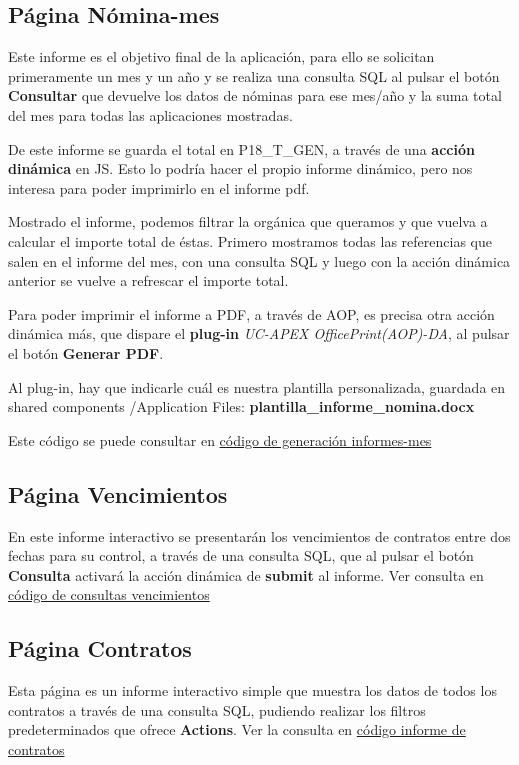 \subsection{Página Nómina-mes}
Este informe es el objetivo final de la aplicación, para ello se solicitan primeramente un mes y un año y se realiza una consulta \acrshort{SQL} al pulsar el botón \textbf{Consultar} que devuelve los datos de nóminas para ese mes/año y la suma total del mes para todas las aplicaciones mostradas.

De este informe se guarda el total en P18\_T\_GEN, a través de una \textbf{acción dinámica} en \acrshort{JS}. Esto lo podría hacer el propio informe dinámico, pero nos interesa para poder imprimirlo en el informe pdf.

Mostrado el informe, podemos filtrar la orgánica que queramos y que vuelva a calcular el importe total de éstas. Primero mostramos todas las referencias que salen en el informe del mes, con una consulta \acrshort{SQL} y luego con la acción dinámica anterior se vuelve a refrescar el importe total.

Para poder imprimir el informe a PDF, a través de \acrfull{AOP}, es precisa otra acción dinámica más, que dispare el \textbf{plug-in} \textit{UC-APEX OfficePrint(AOP)-DA}, al pulsar el botón \textbf{Generar PDF}.

Al plug-in, hay que indicarle cuál es nuestra plantilla personalizada, guardada en shared components  /Application Files: \textbf{plantilla\_informe\_nomina.docx}

Este  código  se puede consultar en  \href{https://github.com/far0010/TFGUBU-Fran_Arroyo/blob/main/project-docs/memoria/sql/consultas_inf_nom_mes.sql}{código de generación informes-mes}


\subsection{Página Vencimientos}
En este informe interactivo se presentarán los vencimientos de contratos entre dos fechas para su control, a través de una consulta \acrshort{SQL}, que al pulsar el botón \textbf{Consulta} activará la acción dinámica de \textbf{submit} al informe.
Ver consulta en \href{https://github.com/far0010/TFGUBU-Fran_Arroyo/project-docs/memoria/sql
	/consultas_inf_vencimientos.sql}{código de consultas vencimientos}

\subsection{Página Contratos}
Esta página es un informe interactivo simple que muestra los datos de todos los contratos a través de una consulta \acrshort{SQL}, pudiendo realizar los filtros predeterminados que ofrece \textbf{Actions}.
Ver la consulta en \href{https://github.com/far0010/TFGUBU-Fran_Arroyo/blob/main/project-docs/memoria/sql/consulta_informe_contratos.sql}{código informe de contratos}

